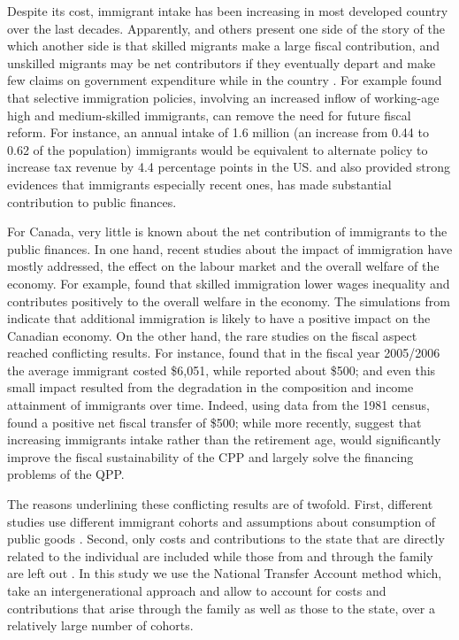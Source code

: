  \vspace{0.7em}\par
  Despite its cost, immigrant intake has been increasing in most developed country over the last decades. Apparently, \citet{Borjas:2014hr} and others present one side of the story of the which another side is that skilled migrants make a large fiscal contribution, and unskilled migrants may be net contributors if they eventually depart and make few claims on government expenditure while in the country \citep{Rowthorn:2008kk}. For example \citet{Storesletten:2000cn} found that selective immigration policies, involving an increased inflow of working-age high and medium-skilled immigrants, can remove the need for future fiscal reform. For instance, an annual intake of 1.6 million (an increase from 0.44 to 0.62 of the population) immigrants would be equivalent to alternate policy to increase tax revenue by 4.4 percentage points in the US. \citet{Akin:2012gh} and \citet{Dustmann:2014dr} also provided strong evidences that immigrants especially recent ones, has made substantial contribution to public finances.


  \vspace{0.7em}\par
  For Canada, very little is known about the net contribution of immigrants to the public finances. In one hand, recent studies about the impact of immigration have mostly addressed, the effect on the labour market and the overall welfare of the economy. For example, \citet{Ileri:2019hf} found that skilled immigration lower wages inequality and contributes positively to the overall welfare in the economy. The simulations from \citet{Dungan:2013jp} indicate that additional immigration is likely to have a positive impact on the Canadian economy. On the other hand, the rare studies on the fiscal aspect reached conflicting results. For instance, \citet{Grubel:2012wo} found that in the fiscal year 2005/2006 the average immigrant costed \$6,051,  while \citet{Javdani:2013gu} reported about \$500; and even this small impact resulted from the degradation in the composition and income attainment of immigrants over time. Indeed, using data from the 1981 census, \citet{Akbari:1989fh} found a positive net fiscal transfer of \$500; while more recently, \citet{Hering.Klassen.2010} suggest that increasing immigrants intake rather than the retirement age, would significantly improve the fiscal sustainability of the CPP and largely solve the financing problems of the QPP.

  \vspace{0.7em}\par
  The reasons underlining these conflicting results are of twofold. First, different studies use different immigrant cohorts and assumptions about consumption of public goods \citep{Grubel:2012wo}. Second, only costs and contributions to the state that are directly related to the individual are included while those from and through the family are left out \citep{dAlbis:2019de}. In this study we use the National Transfer Account method which, take an intergenerational approach and allow to account for costs and contributions that arise through the family as well as those to the state, over a relatively large number of cohorts.

